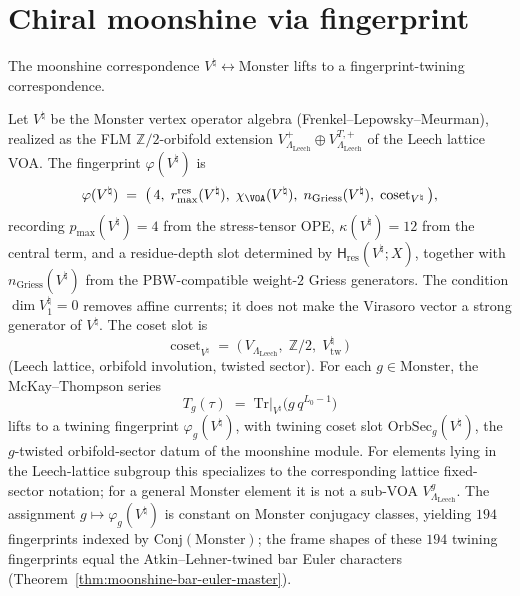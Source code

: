 \section{Chiral moonshine via fingerprint}
\label{sec:part-ii-moonshine}

The moonshine correspondence $V^\natural \leftrightarrow
\mathrm{Monster}$ lifts to a fingerprint-twining correspondence.

\begin{theorem}
\label{thm:part-ii-moonshine-via-fingerprint}
Let $V^\natural$ be the Monster vertex operator algebra
\textup{(}Frenkel--Lepowsky--Meurman\textup{)}, realized as the
FLM $\mathbb{Z}/2$-orbifold extension
$V_{\Lambda_{\mathrm{Leech}}}^+\oplus
V_{\Lambda_{\mathrm{Leech}}}^{T,+}$ of the Leech lattice VOA\@.
The fingerprint $\varphi(V^\natural)$ is
\begin{equation}
 \varphi(V^\natural) \;=\;
 \bigl(\,4,\; r_{\max}^{\mathrm{res}}(V^\natural),\;
 \chi_{\VOA}(V^\natural),\;
 n_{\mathrm{Griess}}(V^\natural),\;
 \mathrm{coset}_{V^\natural}\,\bigr),
\end{equation}
recording $p_{\max}(V^\natural) = 4$ from the stress-tensor OPE,
$\kappa(V^\natural)=12$ from the central term, and a residue-depth
slot determined by $\mathsf H_{\mathrm{res}}(V^\natural;X)$, together
with
$n_{\mathrm{Griess}}(V^\natural)$ from the PBW-compatible
weight-$2$ Griess generators. The condition
$\dim V^\natural_1=0$ removes affine currents; it does not make
the Virasoro vector a strong generator of $V^\natural$.
The coset slot is
\begin{equation}
 \mathrm{coset}_{V^\natural} \;=\;
 \bigl(\,V_{\Lambda_{\mathrm{Leech}}},\; \mathbb{Z}/2,\;
 V^\natural_{\mathrm{tw}}\,\bigr)
\end{equation}
\textup{(}Leech lattice, orbifold involution, twisted sector\textup{)}.
For each $g \in \mathrm{Monster}$, the McKay--Thompson series
\begin{equation}
 T_g(\tau) \;=\; \mathrm{Tr}\bigl|_{V^\natural}\bigl(g\,q^{L_0 -
 1}\bigr)
\end{equation}
lifts to a twining fingerprint $\varphi_g(V^\natural)$, with
twining coset slot $\mathrm{OrbSec}_g(V^\natural)$, the
$g$-twisted orbifold-sector datum of the moonshine module. For
elements lying in the Leech-lattice subgroup this specializes to the
corresponding lattice fixed-sector notation; for a general Monster
element it is not a sub-VOA $V_{\Lambda_{\mathrm{Leech}}}^g$.
The assignment
$g \mapsto \varphi_g(V^\natural)$ is constant on Monster
conjugacy classes, yielding $194$ fingerprints indexed by
$\mathrm{Conj}(\mathrm{Monster})$; the frame shapes of these
$194$ twining fingerprints equal the Atkin--Lehner-twined bar
Euler characters
\textup{(}Theorem~\ref{thm:moonshine-bar-euler-master}\textup{)}.
\end{theorem}

